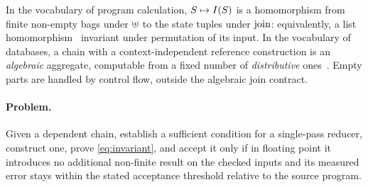 In the vocabulary of program calculation, $S\mapsto I(S)$ is a homomorphism from finite non-empty bags under $\uplus$ to the state tuples under $\operatorname{join}$: equivalently, a list homomorphism~\citep{bird87,gibbons96} invariant under permutation of its input.
In the vocabulary of databases, a chain with a context-independent reference construction is an \emph{algebraic} aggregate, computable from a fixed number of \emph{distributive} ones~\citep{datacube}.
Empty parts are handled by control flow, outside the algebraic join contract.

\paragraph{Problem.}
Given a dependent chain, establish a sufficient condition for a single-pass reducer, construct one, prove \cref{eq:invariant}, and accept it only if in floating point it introduces no additional non-finite result on the checked inputs and its measured error stays within the stated acceptance threshold relative to the source program.

